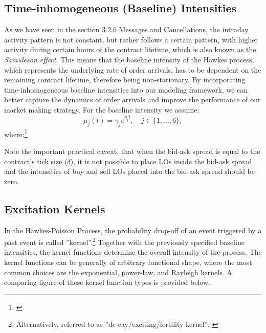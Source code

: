\documentclass[12pt,a4paper]{cau_thesis}
\begin{document}
\subsection{Time-inhomogeneous (Baseline) Intensities}\label{sub_sec:time_inhomogeneous_baseline_intensities}
As we have seen in the section
\hyperref[sub_sec:messages_and_cancellations]{3.2.6 Messages and
    Cancellations}, the intraday activity pattern is not constant, but
rather follows a certain pattern, with higher activity during certain
hours of the contract lifetime, which is also known as the \emph{Samuleson
effect}. This means that the baseline intensity of the Hawkes process,
which represents the underlying rate of order arrivals, has to be
dependent on the remaining contract lifetime, therefore being
non-stationary. By incorporating time-inhomogeneous baseline
intensities into our modeling framework, we can better capture the
dynamics of order arrivals and improve the performance of our market
making strategy. For the baseline intensity we assume:
\begin{equation}\label{eq:baseline_intensity}
    \mu_{j}(t) = \gamma_{j} e^{\eta_{j} t}, \quad j \in \{1, \ldots, 6\},
\end{equation}
where:\footnote{\cite[See ][, p.80]{luckner2021hawkes}}

Note the important practical caveat, that when the bid-ask spread is
equal to the contract’s tick size ($\delta$), it is not possible to
place LOs inside the bid-ask spread and the intensities of buy and
sell LOs placed into the bid-ask spread should be zero.
\subsection{Excitation Kernels}\label{sub_sec:excitation_kernels}
In the Hawkes-Poisson Process, the probability drop-off of an event
triggered by a past event is called ''kernel''.\footnote{Alternatively,
referred to as ''de-cay/exciting/fertility kernel'', \cite[see ][, p.19]{law2015pure} } Together with the
previously specified baseline intensities, the kernel functions
determine the overall intensity of the process. The kernel functions
can be generally of arbitrary functional shape, where the most common
choices are the exponential, power-law, and Rayleigh kernels. A
comparing figure of these kernel function types is provided below.
\end{document}
